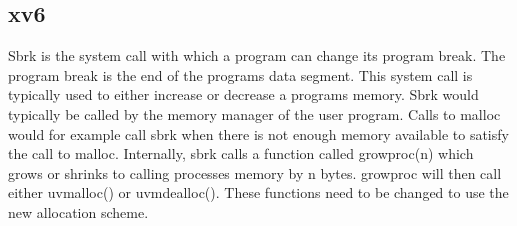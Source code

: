 \subsection{xv6}
Sbrk is the system call with which a program can change its program break. The program break
is the end of the programs data segment. This system call is typically used to either
increase or decrease a programs memory.
Sbrk would typically be called by the memory manager of the user program. Calls
to malloc would for example call sbrk when there is not enough memory available to
satisfy the call to malloc.
Internally, sbrk calls a function called growproc(n) which grows or shrinks to calling
processes memory by n bytes.
growproc will then call either uvmalloc() or uvmdealloc(). These functions need to be
changed to use the new allocation scheme.

